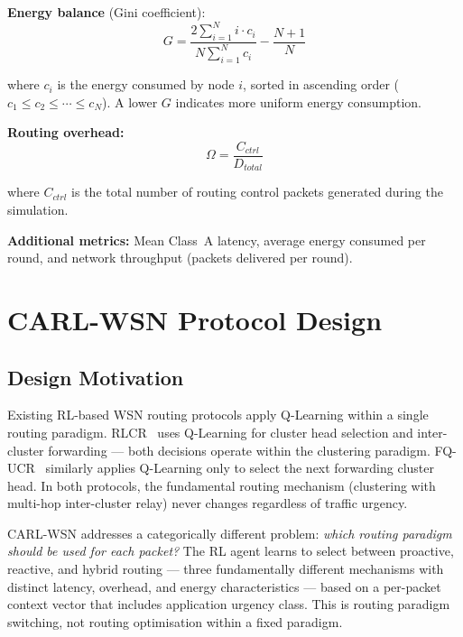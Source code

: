 \documentclass[12pt]{article}
\begin{document}
\textbf{Energy balance} (Gini coefficient):
\begin{equation}
G = \frac{2 \sum_{i=1}^{N} i \cdot c_i}{N \sum_{i=1}^{N} c_i}
  - \frac{N+1}{N}
\label{eq:gini}
\end{equation}

where $c_i$ is the energy consumed by node $i$, sorted in ascending
order ($c_1 \leq c_2 \leq \cdots \leq c_N$). A lower $G$ indicates
more uniform energy consumption.

\textbf{Routing overhead:}
\begin{equation}
\Omega = \frac{C_{ctrl}}{D_{total}}
\label{eq:overhead}
\end{equation}

where $C_{ctrl}$ is the total number of routing control packets
generated during the simulation.

\textbf{Additional metrics:} Mean Class~A latency, average energy
consumed per round, and network throughput (packets delivered per
round).

\section{CARL-WSN Protocol Design}
\label{sec:protocol}

\subsection{Design Motivation}

Existing RL-based WSN routing protocols apply Q-Learning within a
single routing paradigm. RLCR~\cite{daanoune_intelligent_2026} uses
Q-Learning for cluster head selection and inter-cluster forwarding
--- both decisions operate within the clustering paradigm.
FQ-UCR~\cite{wang_fqucr_2025} similarly applies Q-Learning only to
select the next forwarding cluster head. In both protocols, the
fundamental routing mechanism (clustering with multi-hop inter-cluster
relay) never changes regardless of traffic urgency.

CARL-WSN addresses a categorically different problem: \emph{which
routing paradigm should be used for each packet?} The RL agent learns
to select between proactive, reactive, and hybrid routing --- three
fundamentally different mechanisms with distinct latency, overhead,
and energy characteristics --- based on a per-packet context vector
that includes application urgency class. This is routing paradigm
switching, not routing optimisation within a fixed paradigm.
\end{document}
